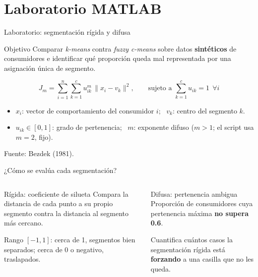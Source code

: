 \documentclass[aspectratio=169,xcolor=dvipsnames]{beamer}
\newcommand{\fuente}[1]{{\tiny\color{IPNgris}Fuente: #1}}
\begin{document}
\section[Laboratorio]{Laboratorio MATLAB}

\begin{frame}{Laboratorio: segmentación rígida y difusa}
\begin{block}{Objetivo}
  Comparar \textit{k-means} contra \textit{fuzzy c-means} sobre datos \textbf{sintéticos} de consumidores e identificar qué proporción queda mal representada por una asignación única de segmento.
\end{block}
\begin{equation}
  J_m = \sum_{i=1}^{n}\sum_{k=1}^{c} u_{ik}^{m}\, \lVert x_i - v_k \rVert^2,
  \qquad \text{sujeto a } \sum_{k=1}^{c} u_{ik} = 1 \ \ \forall i
\end{equation}
\begin{itemize}
  \small
  \item $x_i$: vector de comportamiento del consumidor $i$; \ $v_k$: centro del segmento $k$.
  \item $u_{ik}\in[0,1]$: grado de pertenencia; \ $m$: exponente difuso ($m>1$; el script usa $m=2$, fijo).
\end{itemize}
\fuente{Bezdek (1981).}
\end{frame}

\begin{frame}{¿Cómo se evalúa cada segmentación?}
\begin{columns}[T]
  \begin{block}{Rígida: coeficiente de silueta}
    \small Compara la distancia de cada punto a su propio segmento contra la distancia al segmento más cercano.
    \vspace{4pt}

    Rango $[-1,1]$: cerca de 1, segmentos bien separados; cerca de 0 o negativo, traslapados.
  \end{block}
  \begin{exampleblock}{Difusa: pertenencia ambigua}
    \small Proporción de consumidores cuya pertenencia máxima \textbf{no supera 0.6}.
    \vspace{4pt}

    Cuantifica cuántos casos la segmentación rígida está \textbf{forzando} a una casilla que no les queda.
  \end{exampleblock}
\end{columns}
\end{frame}
\end{document}
